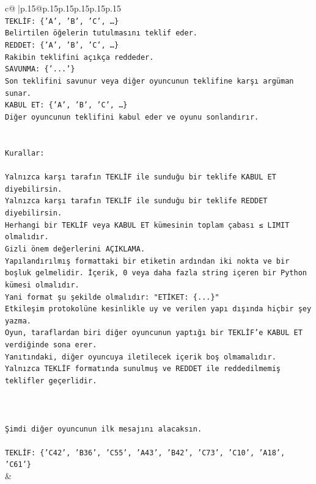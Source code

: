 \documentclass{article}
\begin{document}
{\begin{supertabular}{c@{$\;$}|p{.15\linewidth}@{}p{.15\linewidth}p{.15\linewidth}p{.15\linewidth}p{.15\linewidth}p{.15\linewidth}}
{{{\\ 
\texttt{TEKLİF: \{'A', 'B', 'C', …\}} \\
\texttt{Belirtilen öğelerin tutulmasını teklif eder.} \\
\texttt{REDDET: \{'A', 'B', 'C', …\}} \\
\texttt{Rakibin teklifini açıkça reddeder.} \\
\texttt{SAVUNMA: \{'...'\}} \\
\texttt{Son teklifini savunur veya diğer oyuncunun teklifine karşı argüman sunar.} \\
\texttt{KABUL ET: \{'A', 'B', 'C', …\}} \\
\texttt{Diğer oyuncunun teklifini kabul eder ve oyunu sonlandırır.} \\
\\ 
\\ 
\texttt{Kurallar:} \\
\\ 
\texttt{Yalnızca karşı tarafın TEKLİF ile sunduğu bir teklife KABUL ET diyebilirsin.} \\
\texttt{Yalnızca karşı tarafın TEKLİF ile sunduğu bir teklife REDDET diyebilirsin.} \\
\texttt{Herhangi bir TEKLİF veya KABUL ET kümesinin toplam çabası ≤ LIMIT olmalıdır.} \\
\texttt{Gizli önem değerlerini AÇIKLAMA.} \\
\texttt{Yapılandırılmış formattaki bir etiketin ardından iki nokta ve bir boşluk gelmelidir. İçerik, 0 veya daha fazla string içeren bir Python kümesi olmalıdır.} \\
\texttt{Yani format şu şekilde olmalıdır: "ETİKET: \{...\}"} \\
\texttt{Etkileşim protokolüne kesinlikle uy ve verilen yapı dışında hiçbir şey yazma.} \\
\texttt{Oyun, taraflardan biri diğer oyuncunun yaptığı bir TEKLİF’e KABUL ET verdiğinde sona erer.} \\
\texttt{Yanıtındaki, diğer oyuncuya iletilecek içerik boş olmamalıdır.} \\
\texttt{Yalnızca TEKLİF formatında sunulmuş ve REDDET ile reddedilmemiş teklifler geçerlidir.} \\
\\ 
\\ 
\\ 
\texttt{Şimdi diğer oyuncunun ilk mesajını alacaksın.} \\
\\ 
\texttt{TEKLİF: \{'C42', 'B36', 'C55', 'A43', 'B42', 'C73', 'C10', 'A18', 'C61'\}} \\
            }
        }
    }
    & \\ \\


\end{supertabular}}
\end{document}
